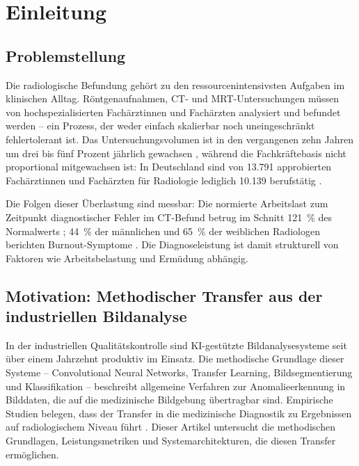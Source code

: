 \section{Einleitung} \label{sec:einleitung}

\subsection{Problemstellung} \label{sec:problemstellung}

Die radiologische Befundung gehört zu den ressourcenintensivsten Aufgaben im klinischen
Alltag. Röntgenaufnahmen, CT- und MRT-Untersuchungen müssen von hochspezialisierten
Fachärztinnen und Fachärzten analysiert und befundet werden -- ein Prozess, der weder
einfach skalierbar noch uneingeschränkt fehlertolerant ist. Das Untersuchungsvolumen
ist in den vergangenen zehn Jahren um drei bis fünf Prozent jährlich gewachsen
\cite{aiSecondReader2024}, während die Fachkräftebasis nicht proportional mitgewachsen
ist: In Deutschland sind von 13.791 approbierten Fachärztinnen und Fachärzten für
Radiologie lediglich 10.139 berufstätig \cite{statistaRadiologen2024}.

Die Folgen dieser Überlastung sind messbar: Die normierte Arbeitslast zum Zeitpunkt
diagnostischer Fehler im CT-Befund betrug im Schnitt 121~\% des Normalwerts
\cite{workloadErrors2023}; 44~\% der männlichen und 65~\% der weiblichen Radiologen
berichten Burnout-Symptome \cite{burnoutACR2024}. Die Diagnoseleistung ist damit
strukturell von Faktoren wie Arbeitsbelastung und Ermüdung abhängig.

\subsection{Motivation: Methodischer Transfer aus der industriellen Bildanalyse}
\label{sec:motivation}

In der industriellen Qualitätskontrolle sind KI-gestützte Bildanalysesysteme seit über
einem Jahrzehnt produktiv im Einsatz. Die methodische Grundlage dieser Systeme --
Convolutional Neural Networks, Transfer Learning, Bildsegmentierung und Klassifikation --
beschreibt allgemeine Verfahren zur Anomalieerkennung in Bilddaten, die auf die
medizinische Bildgebung übertragbar sind. Empirische Studien belegen, dass der Transfer
in die medizinische Diagnostik zu Ergebnissen auf radiologischem Niveau führt
\cite{chexnet2017}. Dieser Artikel untersucht die methodischen Grundlagen, Leistungsmetriken
und Systemarchitekturen, die diesen Transfer ermöglichen.

